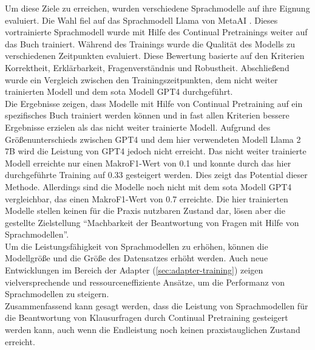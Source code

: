 Um diese Ziele zu erreichen, wurden verschiedene Sprachmodelle auf ihre Eignung evaluiert.
Die Wahl fiel auf das Sprachmodell Llama von MetaAI \citep{llama2}.
Dieses vortrainierte Sprachmodell wurde mit Hilfe des Continual Pretrainings weiter auf das Buch trainiert.
Während des Trainings wurde die Qualität des Modells zu verschiedenen Zeitpunkten evaluiert.
Diese Bewertung basierte auf den Kriterien Korrektheit, Erklärbarkeit, Fragenverständnis und Robustheit.
Abschließend wurde ein Vergleich zwischen den Trainingszeitpunkten, dem nicht weiter trainierten Modell und dem \ac{sota} Modell GPT4 durchgeführt.\\
Die Ergebnisse zeigen, dass Modelle mit Hilfe von Continual Pretraining auf ein spezifisches Buch trainiert werden können und in fast allen Kriterien bessere Ergebnisse erzielen als das nicht weiter trainierte Modell.
Aufgrund des Größenunterschieds zwischen GPT4 und dem hier verwendeten Modell Llama 2 7B wird die Leistung von GPT4 jedoch nicht erreicht.
Das nicht weiter trainierte Modell erreichte nur einen MakroF1-Wert von \num{0.1} und konnte durch das hier durchgeführte Training auf \num{0.33} gesteigert werden.
Dies zeigt das Potential dieser Methode.
Allerdings sind die Modelle noch nicht mit dem \ac{sota} Modell GPT4 vergleichbar, das einen MakroF1-Wert von \num{0.7} erreichte.
Die hier trainierten Modelle stellen keinen für die Praxis nutzbaren Zustand dar, lösen aber die gestellte Zielstellung \enquote{Machbarkeit der Beantwortung von Fragen mit Hilfe von Sprachmodellen}.\\

Um die Leistungsfähigkeit von Sprachmodellen zu erhöhen, können die Modellgröße und die Größe des Datensatzes erhöht werden.
Auch neue Entwicklungen im Bereich der Adapter (\cref{sec:adapter-training}) zeigen vielversprechende und ressourceneffiziente Ansätze, um die Performanz von Sprachmodellen zu steigern.\\

Zusammenfassend kann gesagt werden, dass die Leistung von Sprachmodellen für die Beantwortung von Klausurfragen durch Continual Pretraining gesteigert werden kann, auch wenn die Endleistung noch keinen praxistauglichen Zustand erreicht.\\

\vfill
